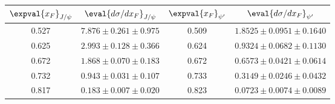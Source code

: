 \begin{tabular}{cc|cc}
\hline
$\expval{x_F}_{J/\psi}$    & $\eval{d\sigma/dx_F}_{J/\psi}$ & $\expval{x_F}_{\psi^\prime}$ & $\eval{d\sigma/dx_F}_{\psi^\prime}$                      \\ \hline
\multicolumn{1}{c|}{0.527} & $7.876\pm0.261\pm0.975$        & \multicolumn{1}{c|}{0.509}                        & $1.8525\pm0.0951\pm0.1640$          \\
\multicolumn{1}{c|}{0.625} & $2.993\pm0.128\pm0.366$        & \multicolumn{1}{c|}{0.624}                        & $0.9324\pm0.0682\pm0.1130$          \\
\multicolumn{1}{c|}{0.672} & $1.868\pm0.070\pm0.183$        & \multicolumn{1}{c|}{0.672}                        & $0.6573\pm0.0421\pm0.0614$          \\
\multicolumn{1}{c|}{0.732} & $0.943\pm0.031\pm0.107$        & \multicolumn{1}{c|}{0.733}                        & $0.3149\pm0.0246\pm0.0432$          \\
\multicolumn{1}{c|}{0.817} & $0.183\pm0.007\pm0.020$        & \multicolumn{1}{c|}{0.823}                        & $0.0723\pm0.0074\pm0.0089$          \\ \hline
\end{tabular}
